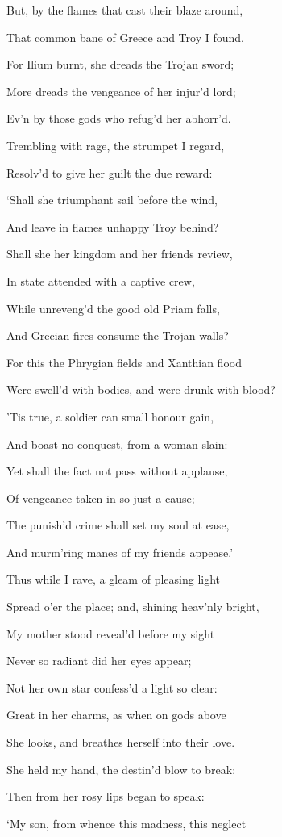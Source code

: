 But, by the flames that cast their blaze around,

That common bane of Greece and Troy I found.

For Ilium burnt, she dreads the Trojan sword;

More dreads the vengeance of her injur’d lord;

Ev’n by those gods who refug’d her abhorr’d.

Trembling with rage, the strumpet I regard,

Resolv’d to give her guilt the due reward:

‘Shall she triumphant sail before the wind,

And leave in flames unhappy Troy behind?

Shall she her kingdom and her friends review,

In state attended with a captive crew,

While unreveng’d the good old Priam falls,

And Grecian fires consume the Trojan walls?

For this the Phrygian fields and Xanthian flood

Were swell’d with bodies, and were drunk with blood?

’Tis true, a soldier can small honour gain,

And boast no conquest, from a woman slain:

Yet shall the fact not pass without applause,

Of vengeance taken in so just a cause;

The punish’d crime shall set my soul at ease,

And murm’ring manes of my friends appease.’

Thus while I rave, a gleam of pleasing light

Spread o’er the place; and, shining heav’nly bright,

My mother stood reveal’d before my sight

Never so radiant did her eyes appear;

Not her own star confess’d a light so clear:

Great in her charms, as when on gods above

She looks, and breathes herself into their love.

She held my hand, the destin’d blow to break;

Then from her rosy lips began to speak:

‘My son, from whence this madness, this neglect

